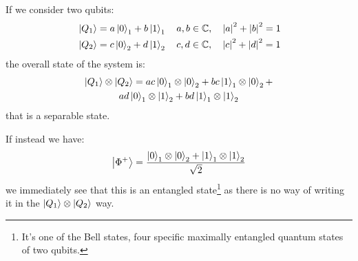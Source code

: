 
If we consider two qubits:
\begin{align*}
    &\ket{Q_1} = a \ket{0}_1 + b \ket{1}_1 \quad a, b \in \mathbb{C}, \quad \abs{a}^2 + \abs{b}^2 = 1 \\
    &\ket{Q_2} = c\ket{0}_2 + d\ket{1}_2 \quad c,d \in \mathbb{C}, \quad \abs{c}^2 + \abs{d}^2 = 1
\end{align*}
the overall state of the system is:
\begin{multline*}
    \ket{Q_1} \otimes \ket{Q_2} = ac \ket{0}_1 \otimes \ket{0}_2 +  bc  \ket{1}_1 \otimes \ket{0}_2 + \\ 
    ad \ket{0}_1 \otimes \ket{1}_2 + bd \ket{1}_1 \otimes \ket{1}_2
\end{multline*}
that is a separable state.

If instead we have:
\begin{equation*}
    \ket{\Phi^+} = \frac{\ket{0}_1 \otimes \ket{0}_2 + \ket{1}_1 \otimes \ket{1}_2}{\sqrt{2}}
\end{equation*}
we immediately see that this is an entangled state\footnote{It's one of the Bell states, four specific maximally entangled quantum states of two qubits.} as there is no way of writing it in the $\ket{Q_1} \otimes \ket{Q_2}$ way. 
